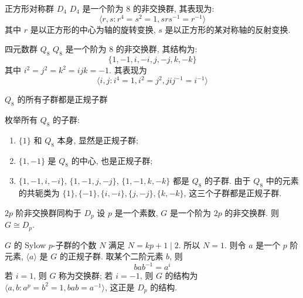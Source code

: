             \begin{ins}
                {正方形对称群 \(D_4\)}
                \(D_4\) 是一个阶为 \(8\) 的非交换群, 其表现为: 
                \[\langle r,s: r^4=s^2=1, srs^{-1}=r^{-1}\rangle\]
                其中 \(r\) 是以正方形的中心为轴的旋转变换, \(s\) 是以正方形的某对称轴的反射变换.
            \end{ins}

            \begin{ins}
                {四元数群 \(Q_8\)}
                \(Q_8\) 是一个阶为 \(8\) 的非交换群, 其结构为: 
                \[\{1, -1, i, -i, j, -j, k, -k\}\]
                其中 \(i^2 = j^2 = k^2 = ijk = -1\). 其表现为
                \[\langle i,j: i^4=1, i^2=j^2, jij^{-1}=i^{-1}\rangle\]
            \end{ins}

            \begin{ppt}
                {\(Q_8\) 的所有子群都是正规子群}
            \end{ppt}

            \begin{rmk}
                枚举所有 \(Q_8\) 的子群:
                \begin{enumerate}
                    \item \(\{1\}\) 和 \(Q_8\) 本身, 显然是正规子群;
                    \item \(\{1, -1\}\) 是 \(Q_8\) 的中心, 也是正规子群;
                    \item \(\{1, -1, i, -i\}\), \(\{1, -1, j, -j\}\), \(\{1, -1, k, -k\}\) 都是 \(Q_8\) 的子群. 由于 \(Q_8\) 中的元素的共轭类为 \(\{1\}, \{-1\}, \{i, -i\}, \{j, -j\}, \{k, -k\}\), 这三个子群都是正规子群.
                \end{enumerate}
            \end{rmk}

            \begin{thm}
                {\(2p\) 阶非交换群同构于 \(D_p\)}
                设 \(p\) 是一个素数, \(G\) 是一个阶为 \(2p\) 的非交换群. 则 \(G\cong D_p\).
            \end{thm}

            \begin{rmk}
                \(G\) 的 Sylow \(p\)-子群的个数 \(N\) 满足 \(N=kp+1\mid 2\). 所以 \(N=1\). 则令 \(a\) 是一个 \(p\) 阶元素, \(\langle a\rangle\) 是 \(G\) 的正规子群. 取某个二阶元素 \(b\), 则
                \[bab^{-1}=a^i\]
                若 \(i=1\), 则 \(G\) 称为交换群; 若 \(i=-1\), 则 \(G\) 的结构为 \(\langle a,b: a^p=b^2=1, bab=a^{-1}\rangle\), 这正是 \(D_p\) 的结构.
            \end{rmk}

